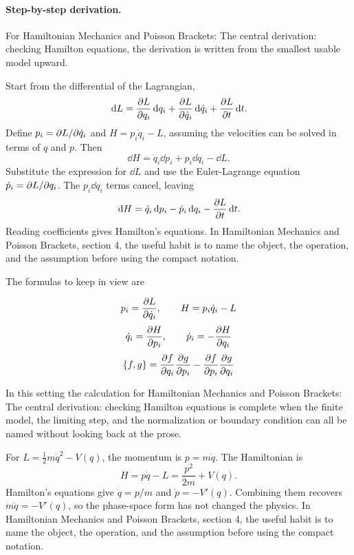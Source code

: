 \paragraph{Step-by-step derivation.}

For Hamiltonian Mechanics and Poisson Brackets: The central derivation: checking Hamilton equations, the derivation is written from the smallest usable model upward.

Start from the differential of the Lagrangian,
\[
  \,\mathrm d L=\frac{\partial L}{\partial q_i}\,\mathrm d q_i+\frac{\partial L}{\partial\dot q_i}\,\mathrm d\dot q_i+\frac{\partial L}{\partial t}\,\mathrm d t.
\]
Define \(p_i=\partial L/\partial\dot q_i\) and \(H=p_i\dot q_i-L\), assuming the velocities can be solved in terms of \(q\) and \(p\).  Then
\[
  \dd H=\dot q_i\dd p_i+p_i\dd\dot q_i-\dd L.
\]
Substitute the expression for \(\dd L\) and use the Euler-Lagrange equation \(\dot p_i=\partial L/\partial q_i\).  The \(p_i\dd\dot q_i\) terms cancel, leaving
\[
  \,\mathrm d H=\dot q_i\,\mathrm d p_i-\dot p_i\,\mathrm d q_i-\frac{\partial L}{\partial t}\,\mathrm d t.
\]
Reading coefficients gives Hamilton's equations.  In Hamiltonian Mechanics and Poisson Brackets, section 4, the useful habit is to name the object, the operation, and the assumption before using the compact notation.

The formulas to keep in view are

\[
  p_i=\frac{\partial L}{\partial\dot q_i},\qquad H=p_i\dot q_i-L
\]
\[
  \dot q_i=\frac{\partial H}{\partial p_i},\qquad \dot p_i=-\frac{\partial H}{\partial q_i}
\]
\[
  \{f,g\}=\frac{\partial f}{\partial q_i}\frac{\partial g}{\partial p_i}-\frac{\partial f}{\partial p_i}\frac{\partial g}{\partial q_i}
\]

In this setting the calculation for Hamiltonian Mechanics and Poisson Brackets: The central derivation: checking Hamilton equations is complete when the finite model, the limiting step, and the normalization or boundary condition can all be named without looking back at the prose.




\begin{example}
For \(L=\frac12m\dot q^2-V(q)\), the momentum is \(p=m\dot q\).  The Hamiltonian is
\[
  H=p\dot q-L=\frac{p^2}{2m}+V(q).
\]
Hamilton's equations give \(\dot q=p/m\) and \(\dot p=-V'(q)\).  Combining them recovers \(m\ddot q=-V'(q)\), so the phase-space form has not changed the physics.  In Hamiltonian Mechanics and Poisson Brackets, section 4, the useful habit is to name the object, the operation, and the assumption before using the compact notation.
\end{example}



